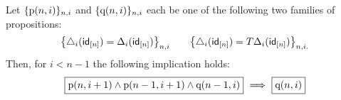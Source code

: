 \begin{lemma}
    Let $\{\mathrm{p}(n, i)\}_{n, i}$ and $\{\mathrm{q}(n, i)\}_{n, i}$ each be one of the following two families of propositions:
    \[ \label{proposition: uniqueness: eq1}
    \big\{ \triangle_i (\mathsf{id}_{[n]}) = \Delta_ i(\mathsf{id}_{[n]}) \big\}_{n, i} \qquad
    \big\{ \triangle_i (\mathsf{id}_{[n]}) = T \Delta_ i(\mathsf{id}_{[n]}) \big\}_{n, i.}
    \]
    Then, for $i < n-1$ the following implication holds:
    \[ \label{proposition: uniqueness: eq2}
    \boxed{\p(n,i+1) \wedge \p(n-1,i+1) \wedge \q(n-1,i)}\ \Longrightarrow\ \boxed{\q(n,i)}
    \]
\end{lemma}

%

%
